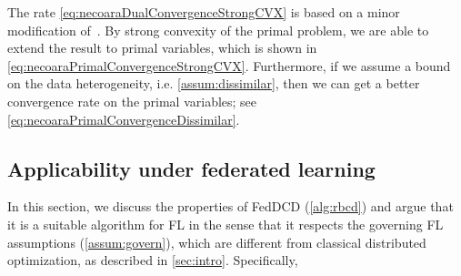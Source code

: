 The rate \eqref{eq:necoaraDualConvergenceStrongCVX} is based on a minor modification of~\citet[Theorem~3.1]{necoara2017random}. By strong convexity of the primal problem, we are able to extend the result to primal variables, which is shown in \autoref{eq:necoaraPrimalConvergenceStrongCVX}. Furthermore, if we assume a bound on the data heterogeneity, i.e. \autoref{assum:dissimilar}, then we can get a better convergence rate on the primal variables; see \autoref{eq:necoaraPrimalConvergenceDissimilar}.

\subsection{Applicability under federated learning}
In this section, we discuss the properties of FedDCD (\autoref{alg:rbcd}) and argue that it is a suitable algorithm for FL in the sense that it respects the governing FL assumptions (\autoref{assum:govern}), which are different from classical distributed optimization, as described in \autoref{sec:intro}. Specifically, 
